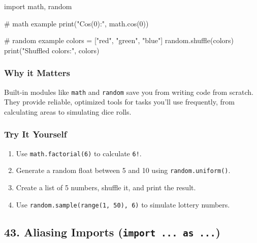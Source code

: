 \documentclass[
  letterpaper,
  DIV=11,
  numbers=noendperiod]{scrreprt}
\newenvironment{Shaded}{\begin{snugshade}}{\end{snugshade}}
\newcommand{\BuiltInTok}[1]{\textcolor[rgb]{0.00,0.23,0.31}{#1}}
\newcommand{\CommentTok}[1]{\textcolor[rgb]{0.37,0.37,0.37}{#1}}
\newcommand{\DecValTok}[1]{\textcolor[rgb]{0.68,0.00,0.00}{#1}}
\newcommand{\ImportTok}[1]{\textcolor[rgb]{0.00,0.46,0.62}{#1}}
\newcommand{\NormalTok}[1]{\textcolor[rgb]{0.00,0.23,0.31}{#1}}
\newcommand{\OperatorTok}[1]{\textcolor[rgb]{0.37,0.37,0.37}{#1}}
\newcommand{\StringTok}[1]{\textcolor[rgb]{0.13,0.47,0.30}{#1}}
\providecommand{\tightlist}{%
  \setlength{\itemsep}{0pt}\setlength{\parskip}{0pt}}
\begin{document}
\begin{Shaded}
\begin{Highlighting}[]
\ImportTok{import}\NormalTok{ math, random}

\CommentTok{\# math example}
\BuiltInTok{print}\NormalTok{(}\StringTok{"Cos(0):"}\NormalTok{, math.cos(}\DecValTok{0}\NormalTok{))}

\CommentTok{\# random example}
\NormalTok{colors }\OperatorTok{=}\NormalTok{ [}\StringTok{"red"}\NormalTok{, }\StringTok{"green"}\NormalTok{, }\StringTok{"blue"}\NormalTok{]}
\NormalTok{random.shuffle(colors)}
\BuiltInTok{print}\NormalTok{(}\StringTok{"Shuffled colors:"}\NormalTok{, colors)}
\end{Highlighting}
\end{Shaded}

\subsubsection{Why it Matters}\label{why-it-matters-41}

Built-in modules like \texttt{math} and \texttt{random} save you from
writing code from scratch. They provide reliable, optimized tools for
tasks you'll use frequently, from calculating areas to simulating dice
rolls.

\subsubsection{Try It Yourself}\label{try-it-yourself-41}

\begin{enumerate}
\def\labelenumi{\arabic{enumi}.}
\tightlist
\item
  Use \texttt{math.factorial(6)} to calculate \texttt{6!}.
\item
  Generate a random float between 5 and 10 using
  \texttt{random.uniform()}.
\item
  Create a list of 5 numbers, shuffle it, and print the result.
\item
  Use \texttt{random.sample(range(1,\ 50),\ 6)} to simulate lottery
  numbers.
\end{enumerate}

\subsection{\texorpdfstring{43. Aliasing Imports
(\texttt{import\ ...\ as\ ...})}{43. Aliasing Imports (import ... as ...)}}\label{aliasing-imports-import-...-as-...}
\end{document}
